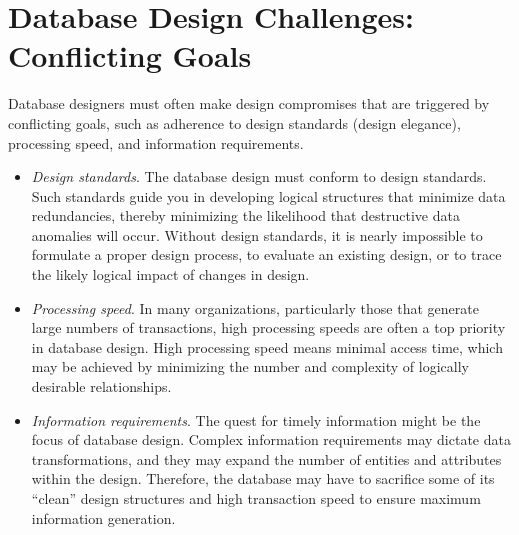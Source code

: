 \documentclass[a4paper, 12pt, titlepage]{report}
\begin{document}
{\section{Database Design Challenges: Conflicting Goals}
Database designers must often make design compromises that are triggered by conflicting goals, such as adherence to design standards (design elegance), processing speed,
and information requirements.
\begin{itemize}
\item \emph{Design standards}. The database design must conform to design standards. Such standards guide you in developing logical structures that minimize data redundancies,
thereby minimizing the likelihood that destructive data anomalies will occur. Without design standards, it is nearly impossible to formulate a proper design process, to evaluate an existing design, or to trace the likely logical impact of changes in design.
\item \emph{Processing speed}. In many organizations, particularly those that generate large numbers of transactions, high processing speeds are often a top priority in database
design. High processing speed means minimal access time, which may be achieved by minimizing the number and complexity of logically desirable relationships.
\item \emph{Information requirements}. The quest for timely information might be the focus of database design. Complex information requirements may dictate data transformations, and they may expand the number of entities and attributes within the design. Therefore, the database may have to sacrifice some of its “clean” design structures and
high transaction speed to ensure maximum information generation.
\end{itemize}

}
\end{document}
